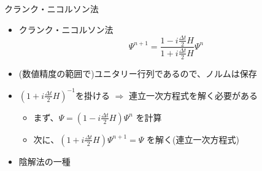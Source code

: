 \begin{frame}[t]{クランク・ニコルソン法}
  \begin{itemize}
  \item クランク・ニコルソン法
    \[
    \Psi^{n+1} = \frac{1 -  i \frac{\Delta t}{2} H}{1 +  i \frac{\Delta t}{2} H} \Psi^{n}
    \]
  \item (数値精度の範囲で)ユニタリー行列であるので、ノルムは保存
  \item $(1 +  i \frac{\Delta t}{2} H)^{-1}$を掛ける $\Rightarrow$ 連立一次方程式を解く必要がある
    \begin{itemize}
    \item まず、$\Psi = (1 - i \frac{\Delta t}{2} H) \Psi^n$ を計算
    \item 次に、$(1 +  i \frac{\Delta t}{2} H) \Psi^{n+1} = \Psi$ を解く(連立一次方程式)
    \end{itemize}
  \item 陰解法の一種
  \end{itemize}
\end{frame}
